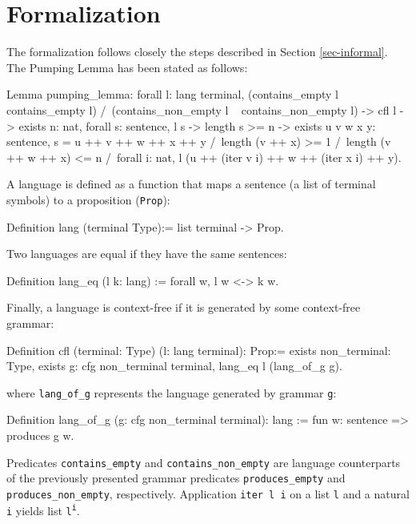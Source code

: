 \documentclass {elsarticle}
\begin{document}
\section {Formalization}
\label {sec-formal}

The formalization follows closely the steps described in Section \ref {sec-informal}. The Pumping Lemma has been stated as follows:

\begin{coq}
Lemma pumping_lemma:
forall l: lang terminal,
(contains_empty l \/ ~ contains_empty l) /\ 
(contains_non_empty l \/ ~ contains_non_empty l) ->
cfl l ->
exists n: nat, 
forall s: sentence, 
l s -> 
length s >= n ->
exists u v w x y: sentence, 
s = u ++ v ++ w ++ x ++ y /\
length (v ++ x) >= 1 /\
length (v ++ w ++ x) <= n /\
forall i: nat, l (u ++ (iter v i) ++ w ++ (iter x i) ++ y).
\end{coq}

A language is defined as a function that maps a sentence (a list of terminal symbols) to a proposition (\texttt {Prop}):

\begin{coq}
Definition lang (terminal Type):= list terminal -> Prop.
\end{coq}

Two languages are equal if they have the same sentences:

\begin{coq}
Definition lang_eq (l k: lang) := 
forall w, l w <-> k w.
\end{coq}

Finally, a language is context-free if it is generated by some context-free grammar:

\begin{coq}
Definition cfl (terminal: Type) (l: lang terminal): Prop:=
exists non_terminal: Type, 
exists g: cfg non_terminal terminal, 
lang_eq l (lang_of_g g).
\end{coq}

\noindent
where \texttt {lang\_of\_g} represents the language generated by grammar \texttt {g}:

\begin{coq}
Definition lang_of_g (g: cfg non_terminal terminal): lang :=
fun w: sentence => produces g w.
\end{coq}

Predicates \texttt {contains\_empty} and \texttt {contains\_non\_empty} are language counterparts of the previously presented grammar predicates \texttt {produces\_empty} and \texttt {produces\_non\_empty}, respectively. Application \texttt {iter l i} on a list \texttt {l} and a natural \texttt {i} yields list \texttt {l\textsuperscript{i}}.
\end{document}
